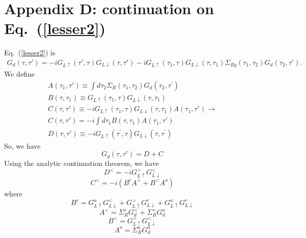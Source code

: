 \documentclass[aps,prb,superscriptaddress]{revtex4-2}
\begin{document}
\section*{Appendix D: continuation on Eq.~(\ref{lesser2})}
Eq.~(\ref{lesser2}) is
\begin{gather}
G_{d}(\tau,\tau') = -iG_{L\uparrow}(\tau',\tau)G_{L\downarrow}(\tau,\tau') -i G_{L\uparrow}(\tau_1,\tau)G_{L\downarrow}(\tau,\tau_1) \Sigma_{Rq}(\tau_1,\tau_2) G_{d}(\tau_2,\tau'). \label{relation5}
\end{gather}
We define
\begin{eqnarray}
A(\tau_{1}, \tau') \equiv\int d\tau_{2}\Sigma_{R }\left(\tau_{1}, \tau_{2}\right) G_{d}\left(\tau_{2}, \tau^{\prime}\right)\\
B(\tau, \tau_{1}) \equiv G_{L \uparrow}\left(\tau_{1}, \tau\right) G_{L \downarrow}\left(\tau, \tau_{1}\right)\\
C(\tau, \tau')\equiv -i G_{L \uparrow}\left(\tau_{1}, \tau\right) G_{L \downarrow}\left(\tau, \tau_{1}\right) A(\tau_{1}, \tau') \rightarrow \\
C(\tau, \tau') = -i\int d\tau_{1}B(\tau, \tau_{1})A(\tau_{1}, \tau')\\
D(\tau, \tau') \equiv -i G_{L \uparrow}\left(\tau^{\prime}, \tau\right) G_{L \downarrow}\left(\tau, \tau^{\prime}\right)
\end{eqnarray}
So, we have
\begin{equation}
G_{d}(\tau, \tau') = D + C
\end{equation}
Using the analytic continuation theorem, we have
\begin{equation}
D^{<} = -i G_{L \uparrow}^{>} G_{L \downarrow}^{<}
\end{equation}
\begin{equation}
C^{<}=-i(B^{r} A^{<}+B^{<} A^{a})
\end{equation}
where
\begin{equation}
B^{r} = G_{L \uparrow}^{a} G_{L \downarrow}^{<}+G_{L \uparrow}^{>} G_{L \downarrow}^{r}+G_{L \uparrow}^{a} G_{L \downarrow}^{r}
\end{equation}
\begin{equation}
A^{<}=\Sigma_{R}^{r} G_{d}^{<}+\Sigma_{R}^{<} G_{d}^{a}
\end{equation}
\begin{equation}
B^{<}=G_{L\uparrow}^{>} G_{L\downarrow}^{<}
\end{equation}
\begin{equation}
A^{a}=\Sigma_{R}^{a} G_{d}^{a}
\end{equation}
\end{document}
